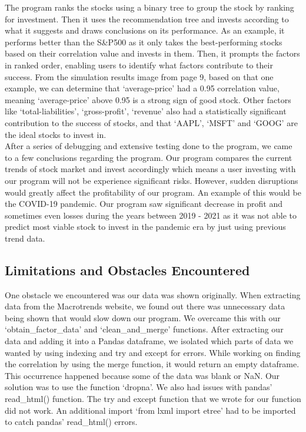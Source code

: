 \documentclass[fontsize=11pt]{article}
\begin{document}
The program ranks the stocks using a binary tree to group the stock by ranking for
investment. Then it uses the recommendation tree and invests according to what it suggests and draws conclusions on its performance. As an example, it performs better than the S\&P500 as it only takes the best-performing stocks based on their correlation value and invests in them. 
 Then, it prompts the factors in ranked order, enabling users to identify what factors contribute to their success. From the simulation results image from page 9, based on that one example, we can determine that `average-price' had a 0.95 correlation value, meaning `average-price' above 0.95 is a strong sign of good stock. Other factors like  `total-liabilities', `gross-profit', `revenue' also had a statistically significant  contribution to the success of stocks, and that `AAPL', `MSFT' and `GOOG' are the ideal stocks to invest in.
 \\
 
After a series of debugging and extensive testing done to the program, we came to a few conclusions regarding the program. Our program compares the current trends of stock market and invest accordingly which means a user investing with our program will not be experience significant risks. However, sudden disruptions would greatly affect the profitability of our program. An example of this would be the COVID-19 pandemic. Our program saw significant decrease in profit and sometimes even losses during the years between 2019 - 2021 as it was not able to predict most viable stock to invest in the pandemic era by just using previous trend data.

\subsection{Limitations and Obstacles Encountered}
One obstacle we encountered was our data was shown originally. When extracting data from the Macrotrends website, we found out there was unnecessary data being shown that would slow down our program. We overcame this with our `obtain\_factor\_data' and `clean\_and\_merge' functions. After extracting our data and adding it into a Pandas dataframe, we isolated which parts of data we wanted by using indexing and try and except for errors. While working on finding the correlation by using the merge function, it would return an empty dataframe. This occurrence happened because some of the data was blank or NaN. Our solution was to use the function `dropna'. We also had issues with pandas' read\_html() function. The try and except function that we wrote for our function did not work. An additional import `from lxml import etree' had to be imported to catch pandas' read\_html() errors.
\\
\end{document}
